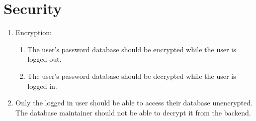\section{Security}
\begin{enumerate}[resume*]

    \item Encryption:
          \begin{enumerate}[label={\textbf{\arabic*.}}]
              \item The user's password database should be encrypted while the user is logged out.
              \item The user's password database should be decrypted while the user is logged in.
          \end{enumerate}
    \item Only the logged in user should be able to access their database unencrypted. The database maintainer should not be able to decrypt it from the backend.

\end{enumerate}